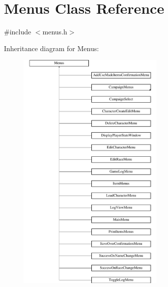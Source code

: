 \hypertarget{class_menus}{}\section{Menus Class Reference}
\label{class_menus}


{\ttfamily \#include $<$menus.\+h$>$}

Inheritance diagram for Menus\+:\begin{figure}[H]
\begin{center}
\leavevmode
\includegraphics[height=12.000000cm]{class_menus}
\end{center}
\end{figure}
